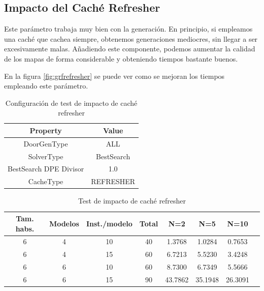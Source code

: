 \subsection{Impacto del Caché Refresher}

Este parámetro trabaja muy bien con la generación. En principio, si empleamos una caché que cachea siempre, obtenemos generaciones mediocres, sin llegar a ser excesivamente malas. Añadiendo este componente, podemos aumentar la calidad de los mapas de forma considerable y obteniendo tiempos bastante buenos.

En la figura \ref{fig:grfrefresher} se puede ver como se mejoran los tiempos empleando este parámetro.

\begin{table}[H]
\begin{center}
	\begin{tabular}{ | c | c | }
\hline
 		Property & Value \\ \hline
DoorGenType & ALL \\ 
SolverType & BestSearch \\ 
BestSearch DPE Divisor & 1.0 \\ 
CacheType & REFRESHER \\ 
\hline
	\end{tabular}
\end{center}
\caption{Configuración de test de impacto de caché refresher}
\label{table:cfg-refresher}
\end{table}



\begin{table}[H]
\begin{center}
	\begin{tabular}{ | c | c | c | c | c | c | c | c |}
\hline
Tam. habs. & Modelos & Inst./modelo & Total & N=2 & N=5 & N=10 \\ \hline 
6 & 4 & 10 & 40 & 1.3768 & 1.0284 & 0.7653 \\ 
6 & 4 & 15 & 60 & 6.7213 & 5.5230 & 3.4248 \\ 
6 & 6 & 10 & 60 & 8.7300 & 6.7349 & 5.5666 \\ 
6 & 6 & 15 & 90 & 43.7862 & 35.1948 & 26.3091 \\ 
\hline
	\end{tabular}
\end{center}
\caption{Test de impacto de caché refresher}
\label{table:refresher}
\end{table}


